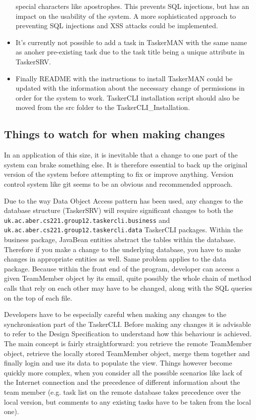 \documentclass{project}
\begin{document}
\begin{itemize}
    special characters like apostrophes. This prevents SQL injections, but has an impact
    on the usability of the system. A more sophisticated approach to preventing SQL injections
    and XSS attacks could be implemented.
  \item It's currently not possible to add a task in TaskerMAN with the same name as anoher pre-existing task due to the task title being a unique attribute in TaskerSRV.
  \item Finally README with the instructions to install TaskerMAN could be updated with
    the information about the necessary change of permissions in order for the system
    to work. TaskerCLI installation script should also be moved from the src folder 
    to the TaskerCLI\_Installation. 
\end{itemize}

\subsection{Things to watch for when making changes}
In an application of this size, it is inevitable that a change to one part of the system
can brake something else. It is therefore essential to back up the original
version of the system before attempting to fix or improve anything. Version control 
system like git seems to be an obvious and recommended approach.

Due to the way Data Object Access pattern has been used, any changes to the database
structure (TaskerSRV) will require significant changes to both the 
\texttt{uk.ac.aber.cs221.group12.taskercli.business} and 
\texttt{uk.ac.aber.cs221.group12.taskercli.data} TaskerCLI packages. Within the business
package, JavaBean entities abstract the tables within the database. Therefore if you
make a change to the underlying database, you have to make changes in appropriate 
entities as well. Same problem applies to the data package. Because within the front end
of the program, developer can access a given TeamMember object by its email, quite
possibly the whole chain of method calls that rely on each other may have to be changed,
along with the SQL queries on the top of each file. 

Developers have to be especially careful when making any changes to the synchronisation
part of the TaskerCLI. Before making any changes it is advisable to refer to the
Design Specification\cite{se.qa.rs} to understand how this behaviour
is achieved. The main concept is fairly straightforward: you retrieve the remote TeamMember
object, retrieve the locally stored TeamMember object, merge them together and finally 
login and use its data to populate the view. Things however become quickly more complex, when
you consider all the possible scenarios like lack of the Internet connection and the precedence
of different information about the team member (e.g. task list on the remote database takes
precedence over the local version, but comments to any existing tasks have to be taken
from the local one). 
\end{document}
